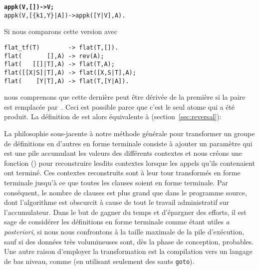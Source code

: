 \begin{enumerate}
\begin{alltt}
\textbf{appk(V,        []) -> V;}
appk(V,[\{k1,Y\}|A]) -> appk([Y|V],A).
\end{alltt}
Si nous comparons cette version avec
\begin{verbatim}
flat_tf(T)        -> flat(T,[]).
flat(       [],A) -> rev(A);
flat(   [[]|T],A) -> flat(T,A);
flat([[X|S]|T],A) -> flat([X,S|T],A);
flat(    [Y|T],A) -> flat(T,[Y|A]).
\end{verbatim}
nous comprenons que cette dernière peut être dérivée de la première si
la paire  est remplacée par~. Ceci est
possible parce que c'est le seul atome qui a été produit. La
définition de  est alors équivalente à
 (section~\vref{sec:reversal}):

\end{enumerate}
La philosophie sous-jacente à notre méthode générale pour transformer
un groupe de définitions en d'autres en forme terminale consiste à
ajouter un paramètre qui est une pile accumulant les valeurs des
différents contextes et nous créons une fonction ()
pour reconstruire lesdits contextes lorsque les appels qu'ils
contenaient ont terminé. Ces contextes reconstruits sont à leur tour
transformés en forme terminale jusqu'à ce que toutes les clauses
soient en forme terminale. Par conséquent, le nombre de clauses est
plus grand que dans le programme source, dont l'algorithme est
obscurcit à cause de tout le travail administratif sur l'accumulateur.
Dans le but de gagner du temps et d'épargner des efforts, il est sage
de considérer les définitions en forme terminale comme étant utiles
\emph{a posteriori}, si nous nous confrontons à la taille maximale de
la pile d'exécution, sauf si des données très volumineuses sont, dès
la phase de conception, probables. Une autre raison d'employer la
transformation est la compilation vers un langage de bas niveau, comme
\Clang (en utilisant seulement des sauts \texttt{goto}).

